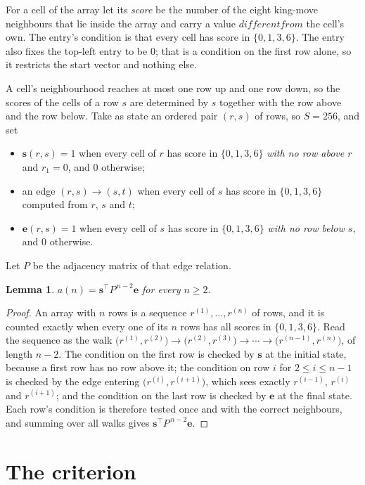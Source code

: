 \documentclass[11pt,a4paper]{article}
\theoremstyle{plain}
\newtheorem{lemma}[theorem]{Lemma}
\theoremstyle{definition}
\begin{document}
For a cell of the array let its \emph{score} be the number of the eight king-move neighbours that lie inside
the array and carry a value $different from$ the cell's own. The entry's condition is that every cell
has score in $\{0,1,3,6\}$. The entry also fixes the top-left entry to be $0$; that is a condition on the first row alone, so it restricts the start vector and nothing else.

A cell's neighbourhood reaches at most one row up and one row down, so the scores of the
cells of a row $s$ are determined by $s$ together with the row above and the row below.
Take as state an ordered pair $(r,s)$ of rows, so $S=256$, and set
\begin{itemize}
\item $\mathbf{s}(r,s)=1$ when every cell of $r$ has score in $\{0,1,3,6\}$ \emph{with no row
above $r$} and $r_1=0$, and $0$ otherwise;
\item an edge $(r,s)\to(s,t)$ when every cell of $s$ has score in $\{0,1,3,6\}$ computed from
$r$, $s$ and $t$;
\item $\mathbf{e}(r,s)=1$ when every cell of $s$ has score in $\{0,1,3,6\}$ \emph{with no row
below $s$}, and $0$ otherwise.
\end{itemize}
Let $P$ be the adjacency matrix of that edge relation.

\begin{lemma}\label{lem:walk}
$a(n)=\mathbf{s}^{\!\top}P^{\,n-2}\mathbf{e}$ for every $n\ge2$.
\end{lemma}

\begin{proof}
An array with $n$ rows is a sequence $r^{(1)},\dots,r^{(n)}$ of rows, and it is counted
exactly when every one of its $n$ rows has all scores in $\{0,1,3,6\}$. Read the sequence as the
walk $\bigl(r^{(1)},r^{(2)}\bigr)\to\bigl(r^{(2)},r^{(3)}\bigr)\to\cdots\to
\bigl(r^{(n-1)},r^{(n)}\bigr)$, of length $n-2$. The condition on the first row is
checked by $\mathbf{s}$ at the initial state, because a first row has no row above it; the
condition on row $i$ for $2\le i\le n-1$ is checked by the edge entering
$\bigl(r^{(i)},r^{(i+1)}\bigr)$, which sees exactly $r^{(i-1)}$, $r^{(i)}$ and
$r^{(i+1)}$; and the condition on the last row is checked by $\mathbf{e}$ at the final
state. Each row's condition is therefore tested once and with the correct neighbours, and
summing over all walks gives $\mathbf{s}^{\!\top}P^{\,n-2}\mathbf{e}$.
\end{proof}

\section{The criterion}
\end{document}
